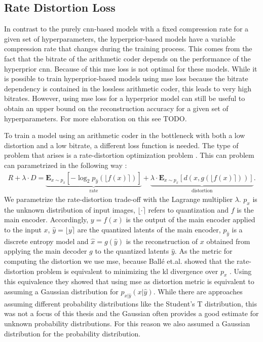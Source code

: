 \subsection{Rate Distortion Loss}
In contrast to the purely \ac{cnn}-based models with a fixed compression rate for a given set of hyperparameters, the hyperprior-based models have a variable compression rate that changes during the training process. This comes from the fact that the bitrate of the arithmetic coder depends on the performance of the hyperprior \ac{cnn}. Because of this \ac{mse} loss is not optimal for these models. While it is possible to train hyperprior-based models using \ac{mse} loss because the bitrate dependency is contained in the lossless arithmetic coder, this leads to very high bitrates. However, using \ac{mse} loss for a hyperprior model can still be useful to obtain an upper bound on the reconstruction accuracy for a given set of hyperparameters. For more elaboration on this see TODO.

To train a model using an arithmetic coder in the bottleneck with both a low distortion and a low bitrate, a different loss function is needed. The type of problem that arises is a rate-distortion optimization problem \citep{balle_variational_2018}. This can problem can parametrized in the following way \citep{minnen_joint_2018}:
\begin{align*}
R + \lambda \cdot D = \underbrace{\mathbf{E}_{x\sim p_x} [ -\log_2 p_{\hat{y}}(\lfloor f(x)\rceil)]}_\text{rate}+ \underbrace{\lambda \cdot\mathbf{E}_{x\sim p_x} [d(x,g(\lfloor f(x)\rceil))]}_\text{distortion}.
\end{align*}
We parametrize the rate-distortion trade-off with the Lagrange multiplier $\lambda$. $p_x$ is the unknown distribution of input images, $\lfloor\cdot\rceil$ refers to quantization and $f$ is the main encoder. Accordingly, $y=f(x)$ is the output of the main encoder applied to the input $x$, $\hat{y} = \lfloor y\rceil$ are the quantized latents of the main encoder, $p_{\hat{y}}$ is a discrete entropy model and $\hat{x}=g(\hat{y})$ is the reconstruction of $x$ obtained from applying the main decoder $g$ to the quantized latents $\hat{y}$. As the metric for computing the distortion we use \ac{mse}, because Ballé et.al. showed that the rate-distortion problem is equivalent to minimizing the \ac{kl} divergence over $p_x$ \citep{balle_variational_2018}. Using this equivalence they showed that using \ac{mse} as distortion metric is equivalent to assuming a Gaussian distribution for $p_{x|\hat{y}}(x|\hat{y})$. While there are approaches assuming different probability distributions like the Student's T distribution, this was not a focus of this thesis and the Gaussian often provides a good estimate for unknown probability distributions. For this reason we also assumed a Gaussian distribution for the probability distribution.

